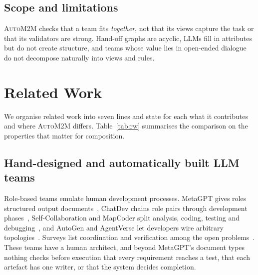 \documentclass[pdflatex,sn-mathphys-num]{sn-jnl}
\theoremstyle{thmstyleone}%
\theoremstyle{thmstyletwo}%
\theoremstyle{thmstylethree}%
\newcommand{\auto}{\textsc{AutoM2M}}
\begin{document}
\subsection{Scope and limitations}\label{sec:app-scope}

\auto{} checks that a team fits \emph{together}, not that its views capture the
task or that its validators are strong. Hand-off graphs are acyclic, LLMs fill
in attributes but do not create structure, and teams whose value lies in
open-ended dialogue do not decompose naturally into views and rules.

\section{Related Work}\label{sec:related}

We organise related work into seven lines and state for each what it
contributes and where \auto{} differs. Table~\ref{tab:rw} summarises the
comparison on the properties that matter for composition.

\subsection{Hand-designed and automatically built LLM teams}\label{sec:rw-teams}\label{sec:rw-builders}

Role-based teams emulate human development processes. MetaGPT gives roles
structured output documents~\cite{hong2024metagpt}, ChatDev chains role pairs
through development phases~\cite{qian2024chatdev}, Self-Collaboration and
MapCoder split analysis, coding, testing and
debugging~\cite{dong2024selfcollab,islam2024mapcoder}, and AutoGen and
AgentVerse let developers wire arbitrary
topologies~\cite{wu2024autogen,chen2024agentverse}. Surveys list coordination
and verification among the open problems~\cite{he2025lma,liu2024agents4se}.
These teams have a human architect, and beyond MetaGPT's document types nothing
checks before execution that every requirement reaches a test, that each
artefact has one writer, or that the system decides completion.
\end{document}
